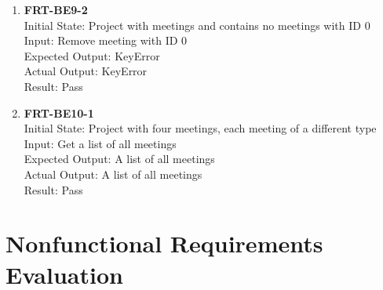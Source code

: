 \documentclass[12pt, titlepage]{article}
\begin{document}
\begin{enumerate}
    \item{\textbf{FRT-BE9-2}}\\
    Initial State: Project with meetings and contains no meetings with ID 0\\
    Input: Remove meeting with ID 0\\
    Expected Output: KeyError\\
    Actual Output: KeyError\\
    Result: Pass
    
    \item{\textbf{FRT-BE10-1}}\\
    Initial State: Project with four meetings, each meeting of a different type\\
    Input: Get a list of all meetings\\
    Expected Output: A list of all meetings\\
    Actual Output: A list of all meetings\\
    Result: Pass
\end{enumerate}

\section{Nonfunctional Requirements Evaluation}
\end{document}

